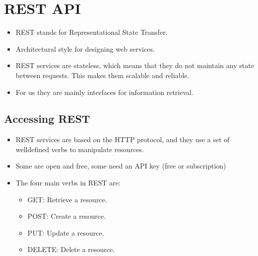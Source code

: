 \documentclass[letterpaper,10pt,english]{jupyterBook}
\begin{document}
\section{REST API}
\label{\detokenize{2_Data_sources/APIs/REST:rest-api}}\label{\detokenize{2_Data_sources/APIs/REST::doc}}\begin{itemize}
\item {} 
\sphinxAtStartPar
REST stands for Representational State Transfer.

\item {} 
\sphinxAtStartPar
Architectural style for designing web services.

\item {} 
\sphinxAtStartPar
REST services are stateless, which means that they do not maintain any state between requests. This makes them scalable and reliable.

\item {} 
\sphinxAtStartPar
For us they are mainly interfaces for information retrieval.

\end{itemize}


\subsection{Accessing REST}
\label{\detokenize{2_Data_sources/APIs/REST:accessing-rest}}\begin{itemize}
\item {} 
\sphinxAtStartPar
REST services are based on the HTTP protocol, and they use a set of well\sphinxhyphen{}defined verbs to manipulate resources.

\item {} 
\sphinxAtStartPar
Some are open and free, some need an API key (free or subscription)

\item {} 
\sphinxAtStartPar
The four main verbs in REST are:
\begin{itemize}
\item {} 
\sphinxAtStartPar
GET: Retrieve a resource.

\item {} 
\sphinxAtStartPar
POST: Create a resource.

\item {} 
\sphinxAtStartPar
PUT: Update a resource.

\item {} 
\sphinxAtStartPar
DELETE: Delete a resource.

\end{itemize}

\end{itemize}
\end{document}
